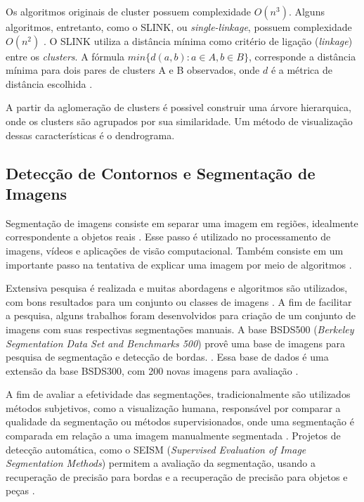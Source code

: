 \begin{document}
Os algoritmos originais de cluster possuem complexidade $O(n^3)$. Alguns algoritmos, entretanto, como o SLINK, ou \textit{single-linkage}, possuem complexidade $O(n^2)$ \cite{SLINK}. O SLINK utiliza a distância mínima como critério de ligação (\textit{linkage}) entre os \textit{clusters}. A fórmula $min\{d(a,b): a \in A, b \in B \}$, corresponde a distância mínima para dois pares de clusters A e B observados, onde $d$ é a métrica de distância escolhida \cite{WIKI_CLUSTER_HIERARCHY}.

A partir da aglomeração de clusters é possivel construir uma árvore hierarquica, onde os clusters são agrupados por sua similaridade. Um método de visualização dessas características é o dendrograma. 


\subsection{Detecção de Contornos e Segmentação de Imagens} \label{ssec:segmentacao}

Segmentação de imagens consiste em separar uma imagem em regiões, idealmente correspondente a objetos reais \cite{ZHANG2008}. Esse passo é utilizado no processamento de imagens, vídeos e aplicações de visão computacional. Também consiste em um importante passo na tentativa de explicar uma imagem por meio de algoritmos \cite{ZHANG2008}.

Extensiva pesquisa é realizada e muitas abordagens e algoritmos são utilizados, com bons resultados para um conjunto ou classes de imagens \cite{ZHANG2008}. A fim de facilitar a pesquisa, alguns trabalhos foram desenvolvidos para criação de um conjunto de imagens com suas respectivas segmentações manuais. A base BSDS500 (\textit{Berkeley Segmentation Data Set and Benchmarks 500}) provê uma base de imagens para pesquisa de segmentação e detecção de bordas. \cite{BSDS500}. Essa base de dados é uma extensão da base BSDS300, com 200 novas imagens para avaliação \cite{BSDS500}.

A fim de avaliar a efetividade das segmentações, tradicionalmente são utilizados métodos subjetivos, como a visualização humana, responsável por comparar a qualidade da segmentação ou métodos supervisionados, onde uma segmentação é comparada em relação a uma imagem manualmente segmentada \cite{ZHANG2008}. Projetos de detecção automática, como o SEISM (\textit{Supervised Evaluation of Image Segmentation Methods}) permitem a avaliação da segmentação, usando a recuperação de precisão para bordas e a recuperação de precisão para objetos e peças \cite{SEISM}.
\end{document}
